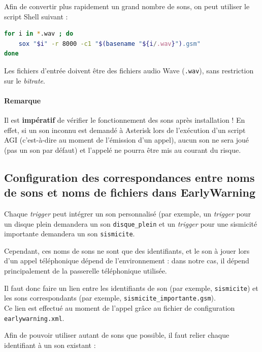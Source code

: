 \documentclass{article}
\begin{document}
Afin de convertir plus rapidement un grand nombre de sons, on peut utiliser le script Shell suivant :

\begin{lstlisting}[language=bash,name=Script de conversion de fichiers WAV en GSM]
for i in *.wav ; do 
    sox "$i" -r 8000 -c1 "$(basename "${i/.wav}").gsm"
done
\end{lstlisting}

Les fichiers d'entrée doivent être des fichiers audio Wave (\texttt{.wav}), sans restriction sur le \emph{bitrate}.

\paragraph{Remarque} Il est \textbf{impératif} de vérifier le fonctionnement des sons après installation ! En effet, si un son inconnu est demandé à Asterisk lors de l'exécution d'un script AGI (c'est-à-dire au moment de l'émission d'un appel), aucun son ne sera joué (pas un son par défaut) et l'appelé ne pourra être mis au courant du risque.

\subsection{Configuration des correspondances entre noms de sons et noms de fichiers dans EarlyWarning}

Chaque \emph{trigger} peut intégrer un son personnalisé (par exemple, un \emph{trigger} pour un disque plein demandera un son \texttt{disque\_plein} et un \emph{trigger} pour une sismicité importante demandera un son \texttt{sismicite}. 

Cependant, ces noms de sons ne sont que des identifiants, et le son à jouer lors d'un appel téléphonique dépend de l'environnement : dans notre cas, il dépend principalement de la passerelle téléphonique utilisée.

Il faut donc faire un lien entre les identifiants de son (par exemple, \texttt{sismicite}) et les sons correspondants (par exemple, \texttt{sismicite\_importante.gsm}). \\
Ce lien est effectué au moment de l'appel grâce au fichier de configuration \texttt{earlywarning.xml}.

Afin de pouvoir utiliser autant de sons que possible, il faut relier chaque identifiant à un son existant :

\end{document}
